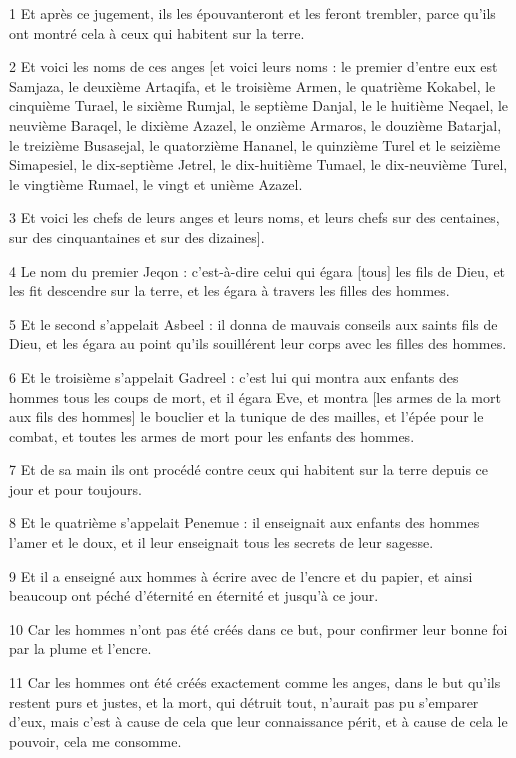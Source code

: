 
\par 1 Et après ce jugement, ils les épouvanteront et les feront trembler, parce qu'ils ont montré cela à ceux qui habitent sur la terre.
\par 2 Et voici les noms de ces anges [et voici leurs noms : le premier d'entre eux est Samjaza, le deuxième Artaqifa, et le troisième Armen, le quatrième Kokabel, le cinquième Turael, le sixième Rumjal, le septième Danjal, le le huitième Neqael, le neuvième Baraqel, le dixième Azazel, le onzième Armaros, le douzième Batarjal, le treizième Busasejal, le quatorzième Hananel, le quinzième Turel et le seizième Simapesiel, le dix-septième Jetrel, le dix-huitième Tumael, le dix-neuvième Turel, le vingtième Rumael, le vingt et unième Azazel.
\par 3 Et voici les chefs de leurs anges et leurs noms, et leurs chefs sur des centaines, sur des cinquantaines et sur des dizaines].
\par 4 Le nom du premier Jeqon : c'est-à-dire celui qui égara [tous] les fils de Dieu, et les fit descendre sur la terre, et les égara à travers les filles des hommes.
\par 5 Et le second s'appelait Asbeel : il donna de mauvais conseils aux saints fils de Dieu, et les égara au point qu'ils souillérent leur corps avec les filles des hommes.
\par 6 Et le troisième s'appelait Gadreel : c'est lui qui montra aux enfants des hommes tous les coups de mort, et il égara Eve, et montra [les armes de la mort aux fils des hommes] le bouclier et la tunique de des mailles, et l'épée pour le combat, et toutes les armes de mort pour les enfants des hommes.
\par 7 Et de sa main ils ont procédé contre ceux qui habitent sur la terre depuis ce jour et pour toujours.
\par 8 Et le quatrième s'appelait Penemue : il enseignait aux enfants des hommes l'amer et le doux, et il leur enseignait tous les secrets de leur sagesse.
\par 9 Et il a enseigné aux hommes à écrire avec de l'encre et du papier, et ainsi beaucoup ont péché d'éternité en éternité et jusqu'à ce jour.
\par 10 Car les hommes n'ont pas été créés dans ce but, pour confirmer leur bonne foi par la plume et l'encre.
\par 11 Car les hommes ont été créés exactement comme les anges, dans le but qu'ils restent purs et justes, et la mort, qui détruit tout, n'aurait pas pu s'emparer d'eux, mais c'est à cause de cela que leur connaissance périt, et à cause de cela le pouvoir, cela me consomme.
